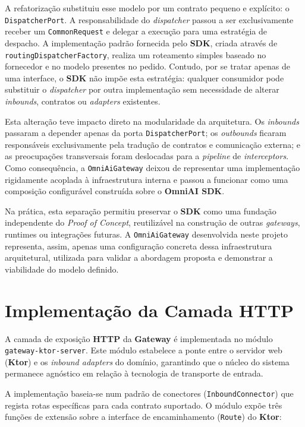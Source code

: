 A refatorização substituiu esse modelo por um contrato pequeno e explícito: o \texttt{DispatcherPort}. A responsabilidade do \textit{dispatcher} passou a ser exclusivamente receber um \texttt{CommonRequest} e delegar a execução para uma estratégia de despacho. A implementação padrão fornecida pelo \textbf{SDK}, criada através de \texttt{routingDispatcherFactory}, realiza um roteamento simples baseado no fornecedor e no modelo presentes no pedido. Contudo, por se tratar apenas de uma interface, o \textbf{SDK} não impõe esta estratégia: qualquer consumidor pode substituir o \textit{dispatcher} por outra implementação sem necessidade de alterar \textit{inbounds}, contratos ou \textit{adapters} existentes.

Esta alteração teve impacto direto na modularidade da arquitetura. Os \textit{inbounds} passaram a depender apenas da porta \texttt{DispatcherPort}; os \textit{outbounds} ficaram responsáveis exclusivamente pela tradução de contratos e comunicação externa; e as preocupações transversais foram deslocadas para a \textit{pipeline} de \textit{interceptors}. Como consequência, a \texttt{OmniAiGateway} deixou de representar uma implementação rigidamente acoplada à infraestrutura interna e passou a funcionar como uma composição configurável construída sobre o \textbf{OmniAI SDK}.

Na prática, esta separação permitiu preservar o \textbf{SDK} como uma fundação independente do \textit{Proof of Concept}, reutilizável na construção de outras \textit{gateways}, runtimes ou integrações futuras. A \texttt{OmniAiGateway} desenvolvida neste projeto representa, assim, apenas uma configuração concreta dessa infraestrutura arquitetural, utilizada para validar a abordagem proposta e demonstrar a viabilidade do modelo definido.

    \section{Implementação da Camada \textbf{HTTP}}
    \label{sec:gateway-ktor-server}

    A camada de exposição \textbf{HTTP} da \textbf{Gateway} é implementada no módulo \texttt{gateway-ktor-server}. Este módulo estabelece a ponte entre o servidor web (\textbf{Ktor}) e os \textit{inbound adapters} do domínio, garantindo que o núcleo do sistema permanece agnóstico em relação à tecnologia de transporte de entrada.

    A implementação baseia-se num padrão de conectores (\texttt{InboundConnector}) que regista rotas específicas para cada contrato suportado. O módulo expõe três funções de extensão sobre a interface de encaminhamento (\texttt{Route}) do \textbf{Ktor}:

